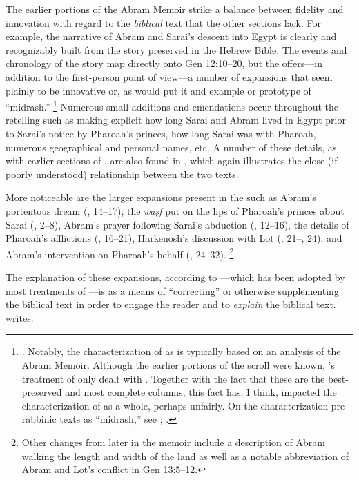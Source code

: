 The earlier portions of the Abram Memoir strike a balance between fidelity and innovation with regard to the \emph{biblical} text that the other sections lack. For example, the narrative of Abram and Sarai's descent into Egypt is clearly and recognizably built from the story preserved in the Hebrew Bible. The events and chronology of the story map directly onto Gen 12:10--20, but the \ga offers---in addition to the first-person point of view---a number of expansions that seem plainly to be innovative or, as \vermes would put it and example or prototype of ``midrash.''%
%
\footnote{\cite[124]{vermes1961}. Notably, the characterization of \ga as \rwb is typically based on an analysis of the Abram Memoir. Although the earlier portions of the scroll were known, \vermes's treatment of \ga only dealt with . Together with the fact that these are the best-preserved and most complete columns, this fact has, I think, impacted the characterization of \ga as a whole, perhaps unfairly. On the characterization pre-rabbinic texts as ``midrash,'' see \cite[esp. 298--305]{mandel2017}; \cite{mandel_bakhos2006}.}
% 
Numerous small additions and emendations occur throughout the retelling such as making explicit how long Sarai and Abram lived in Egypt prior to Sarai's notice by Pharoah's princes, how long Sarai was with Pharoah, numerous geographical and personal names, etc. A number of these details, as with earlier sections of \ga, are also found in \jub, which again illustrates the close (if poorly understood) relationship between the two texts.

More noticeable are the larger expansions present in the \ga such as Abram's portentous dream (, 14--17), the \emph{waṣf} put on the lips of Pharoah's princes about Sarai (, 2--8), Abram's prayer following Sarai's abduction (, 12--16), the details of Pharoah's afflictions (, 16--21), Harkenosh's discussion with Lot (, 21--, 24), and Abram's intervention on Pharoah's behalf (, 24--32).%
%
\footnote{Other changes from later in the memoir include a description of Abram walking the length and width of the land as well as a notable abbreviation of Abram and Lot's conflict in Gen 13:5--12.}

The explanation of these expansions, according to \vermes---which has been adopted by most treatments of \ga---is as a means of ``correcting'' or otherwise supplementing the biblical text in order to engage the reader and to \emph{explain} the biblical text.\autocite[126]{vermes1961} \vermes writes:

